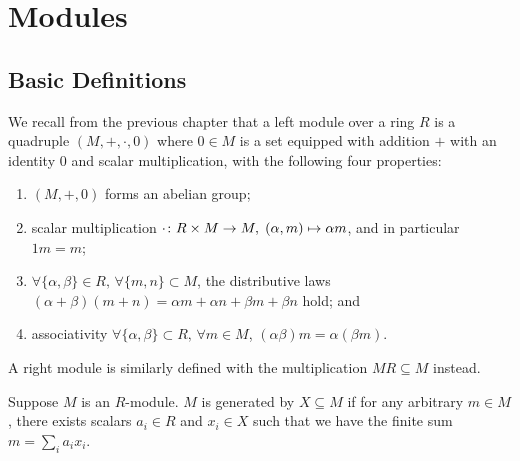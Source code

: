 \chapter{Modules}\label{sec:modules}

\section{Basic Definitions}

\begin{definition}
    We recall from the previous chapter that
    a left module over a ring \(R\) is a quadruple \((M,+,\cdot,0)\)
    where \(0 \in M\) is a set equipped with addition \(+\)
    with an identity \(0\)
    and scalar multiplication,
    with the following four properties:
    \begin{enumerate}[label={(\roman*)}, itemsep=0mm]
        \item \((M,+,0)\) forms an abelian group;
        \item scalar multiplication
            \(\cdot\colon R \times M\to M,\;(\alpha,m)\mapsto\alpha m\),
            and in particular \(1m = m\);
        \item \(\forall\{\alpha,\beta\} \in R,\, \forall\{m,n\} \subset M\),
            the distributive laws \((\alpha+\beta)(m+n)
            = \alpha m+\alpha n+\beta m+\beta n\) hold; and
        \item associativity
            \(\forall\{\alpha,\beta\} \subset R,\,\forall m \in M\),
            \((\alpha\beta)m = \alpha(\beta m)\).
    \end{enumerate}
    A right module is similarly defined with the multiplication \(MR \subseteq M\) instead.
\end{definition}

\begin{definition}
    Suppose \(M\) is an \(R\)-module.
    \(M\) is generated by \(X \subseteq M\)
    if for any arbitrary \(m \in M\),
    there exists scalars \(a_i \in R\) and \(x_i \in X\) such that
    we have the finite sum \(m = \sum_i a_i x_i\).
\end{definition}

